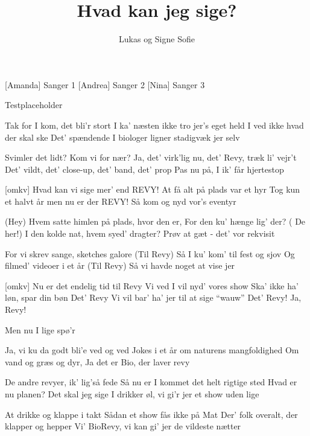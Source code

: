 \documentclass[a4paper,11pt]{article}
\title{Hvad kan jeg sige?}
\author{Lukas og Signe Sofie}
\begin{document}
\maketitle

\begin{roles}
    [Amanda] Sanger 1
    [Andrea] Sanger 2
    [Nina] Sanger 3
\end{roles}

\begin{props}
	 Testplaceholder
\end{props}

\begin{song}
   Tak for I kom, det bli’r stort
I ka’ næsten ikke tro jer’s eget held
I ved ikke hvad der skal ske
Det’ spændende
I biologer ligner stadigvæk jer selv

  Svimler det lidt? Kom vi for nær?
Ja, det’ virk’lig nu, det’ Revy, træk li’ vejr’t
Det’ vildt, det' close-up, det' band, det' prop
Pas nu på, I ik’ får hjertestop


  [omkv] Hvad kan vi sige mer’ end REVY!
At få alt på plads var et hyr
Tog kun et halvt år men nu er der REVY!
Så kom og nyd vor’s eventyr

 
  (Hey) Hvem satte himlen på plads, hvor den er,
For den ku’ hænge lig' der? ( De her!)
I den kolde nat, hvem syed’ dragter?
Prøv at gæt - det’ vor rekvisit


 For vi skrev sange, sketches galore
(Til Revy)
Så I ku’ kom’ til fest og sjov
Og filmed’ videoer i et år
(Til Revy)
Så vi havde noget at vise jer

  [omkv] Nu er det endelig tid til Revy
Vi ved I vil nyd’ vores show
Ska’ ikke ha’ løn, spar din bøn
Det’ Revy
Vi vil bar’ ha’ jer til at sige “wauw”
Det’ Revy! Ja, Revy!

  Men nu I lige spø’r

 Ja, vi ku da godt bli’e ved og ved
Jokes i et år om naturens mangfoldighed
Om vand og græs og dyr,
Ja det er Bio, der laver revy

De andre revyer, ik’ lig’så fede
Så nu er I kommet det helt rigtige sted
Hvad er nu planen? Det skal jeg sige
I drikker øl, vi gi’r jer et show uden lige 

 At drikke og klappe i takt
Sådan et show fås ikke på Mat
Der’ folk overalt, der klapper og hepper
Vi’ BioRevy, vi kan gi' jer de vildeste nætter


\end{song}
\end{document}
